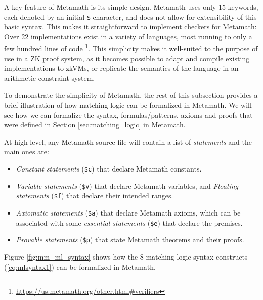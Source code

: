 \documentclass{article}
\theoremstyle{plain}
\theoremstyle{definition}
\begin{document}
A key feature of Metamath is its simple design. Metamath uses only 15 keywords, each denoted by an initial \texttt{\$} character, and does not allow for extensibility of this basic syntax. This makes it straightforward to implement checkers for Metamath: Over 22 implementations exist in a variety of languages, most running to only a few hundred lines of code \footnote{\url{https://us.metamath.org/other.html\#verifiers}}. This simplicity makes it well-suited to the purpose of use in a ZK proof system, as it becomes possible to adapt and compile existing implementations to zkVMs, or replicate the semantics of the language in an arithmetic constraint system.

To demonstrate the simplicity of Metamath, the rest of this subsection provides a brief illustration of how matching logic can be formalized in Metamath. We will see how we can formalize the syntax, formulas/patterns, axioms and proofs that were defined in Section \ref{sec:matching_logic} in Metamath.

At high level, any Metamath source file will contain a list of \textit{statements} and the main ones are:

\begin{itemize}
    \item \textit{Constant statements} (\lstinline{$c}) that declare Metamath constants.
    \item \textit{Variable statements} (\lstinline{$v}) that declare Metamath variables, and \textit{Floating statements} (\lstinline{$f}) that declare their intended ranges.
    \item \textit{Axiomatic statements} (\lstinline{$a}) that declare Metamath axioms, which can be associated with some \textit{essential statements} (\lstinline{$e}) that declare the premises.
    \item \textit{Provable statements} (\lstinline{$p}) that state Metamath theorems and their proofs.
\end{itemize}

Figure \ref{fig:mm_ml_syntax} shows how the 8 matching logic syntax constructs (\ref{eq:mlsyntax1}) can be formalized in Metamath. 
\end{document}
